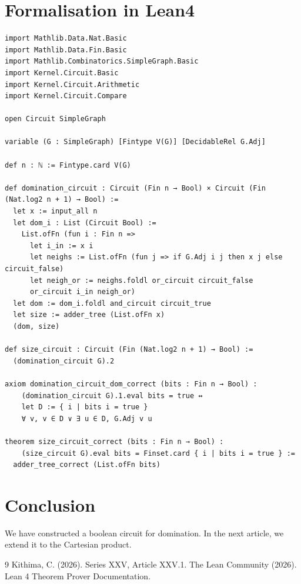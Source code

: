 \documentclass[11pt,a4paper]{article}
\begin{document}
\section{Formalisation in Lean4}
\begin{lstlisting}[style=lean, caption={DominationCircuit.lean (final)}]
import Mathlib.Data.Nat.Basic
import Mathlib.Data.Fin.Basic
import Mathlib.Combinatorics.SimpleGraph.Basic
import Kernel.Circuit.Basic
import Kernel.Circuit.Arithmetic
import Kernel.Circuit.Compare

open Circuit SimpleGraph

variable (G : SimpleGraph) [Fintype V(G)] [DecidableRel G.Adj]

def n : ℕ := Fintype.card V(G)

def domination_circuit : Circuit (Fin n → Bool) × Circuit (Fin (Nat.log2 n + 1) → Bool) :=
  let x := input_all n
  let dom_i : List (Circuit Bool) :=
    List.ofFn (fun i : Fin n =>
      let i_in := x i
      let neighs := List.ofFn (fun j => if G.Adj i j then x j else circuit_false)
      let neigh_or := neighs.foldl or_circuit circuit_false
      or_circuit i_in neigh_or)
  let dom := dom_i.foldl and_circuit circuit_true
  let size := adder_tree (List.ofFn x)
  (dom, size)

def size_circuit : Circuit (Fin (Nat.log2 n + 1) → Bool) :=
  (domination_circuit G).2

axiom domination_circuit_dom_correct (bits : Fin n → Bool) :
    (domination_circuit G).1.eval bits = true ↔
    let D := { i | bits i = true }
    ∀ v, v ∈ D ∨ ∃ u ∈ D, G.Adj v u

theorem size_circuit_correct (bits : Fin n → Bool) :
    (size_circuit G).eval bits = Finset.card { i | bits i = true } :=
  adder_tree_correct (List.ofFn bits)
\end{lstlisting}

\section{Conclusion}
We have constructed a boolean circuit for domination. In the next article, we extend it to the Cartesian product.


\begin{thebibliography}{9}
  Kithima, C. (2026). Series XXV, Article XXV.1.
  The Lean Community (2026). Lean 4 Theorem Prover Documentation.
\end{thebibliography}
\end{document}
